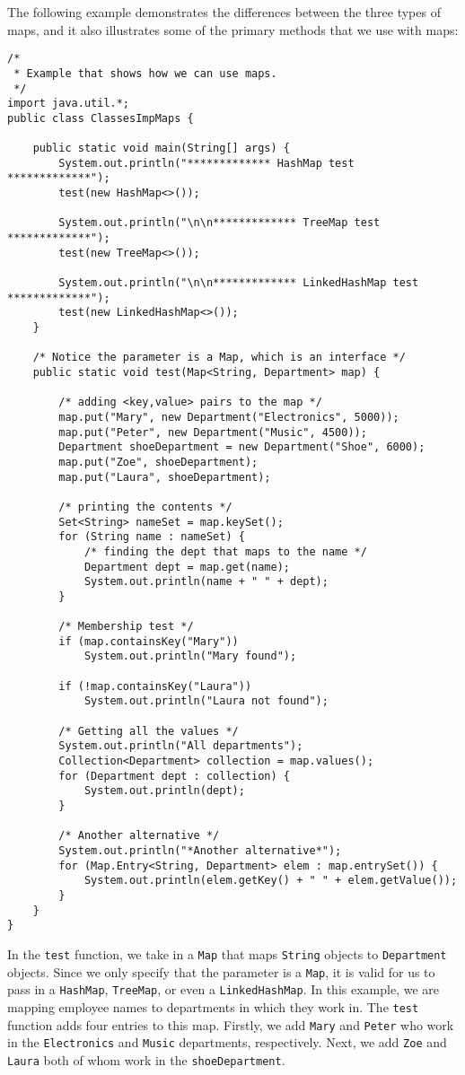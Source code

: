 The following example demonstrates the differences between the three types of maps, and it also illustrates some of the primary methods that we use with maps:

\begin{lstlisting}
/*
 * Example that shows how we can use maps.
 */
import java.util.*;
public class ClassesImpMaps {
	
	public static void main(String[] args) {
		System.out.println("************* HashMap test *************");
		test(new HashMap<>());
	
		System.out.println("\n\n************* TreeMap test *************");
		test(new TreeMap<>());
		
		System.out.println("\n\n************* LinkedHashMap test *************");
		test(new LinkedHashMap<>());
	}
	
	/* Notice the parameter is a Map, which is an interface */
	public static void test(Map<String, Department> map) {
		
		/* adding <key,value> pairs to the map */
		map.put("Mary", new Department("Electronics", 5000));
		map.put("Peter", new Department("Music", 4500));
		Department shoeDepartment = new Department("Shoe", 6000);
		map.put("Zoe", shoeDepartment);
		map.put("Laura", shoeDepartment);
	
		/* printing the contents */
		Set<String> nameSet = map.keySet();
		for (String name : nameSet) { 
			/* finding the dept that maps to the name */
			Department dept = map.get(name);
			System.out.println(name + " " + dept); 
		}
		
		/* Membership test */
		if (map.containsKey("Mary"))
			System.out.println("Mary found");
		
		if (!map.containsKey("Laura"))
			System.out.println("Laura not found");
		
		/* Getting all the values */
		System.out.println("All departments");
		Collection<Department> collection = map.values();
		for (Department dept : collection) {
			System.out.println(dept);
		} 
		
		/* Another alternative */
		System.out.println("*Another alternative*");
		for (Map.Entry<String, Department> elem : map.entrySet()) {
			System.out.println(elem.getKey() + " " + elem.getValue());
		}
	}
}
\end{lstlisting}

In the \verb!test! function, we take in a \verb!Map! that maps \verb!String! objects to \verb!Department! objects. Since we only specify that the parameter is a \verb!Map!, it is valid for us to pass in a \verb!HashMap!, \verb!TreeMap!, or even a \verb!LinkedHashMap!. In this example, we are mapping employee names to departments in which they work in. The \verb!test! function adds four entries to this map. Firstly, we add \verb!Mary! and \verb!Peter! who work in the \verb!Electronics! and \verb!Music! departments, respectively. Next, we add \verb!Zoe! and \verb!Laura! both of whom work in the \verb!shoeDepartment!. \\

